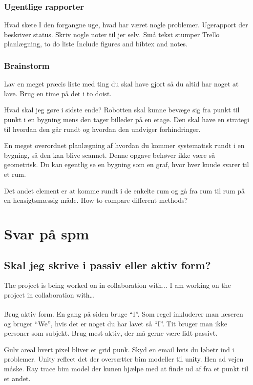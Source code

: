 \subsubsection{Ugentlige rapporter}
Hvad skete I den forgangne uge, hvad har været nogle problemer.
Ugerapport der beskriver status.
Skriv nogle noter til jer selv.
Små tekst stumper
Trello planlægning, to do liste
Include figures and bibtex and notes.


\subsubsection{Brainstorm}
Lav en meget præcis liste med ting du skal have gjort så du altid har noget at lave.
Brug en time på det i to doist.

Hvad skal jeg gøre i sidste ende?
Robotten skal kunne bevæge sig fra punkt til punkt i en bygning mens den tager billeder på en etage. Den skal have en strategi til hvordan den går rundt og hvordan den undviger forhindringer.

En meget overordnet planlægning af hvordan du kommer systematisk rundt i en bygning, så den kan blive scannet.
Denne opgave behøver ikke være så geometrisk. Du kan egentlig se en bygning som en graf, hvor hver knude svarer til et rum.

Det andet element er at komme rundt i de enkelte rum og gå fra rum til rum på en hensigtsmæssig måde.
How to compare different methods?

\section{Svar på spm}
\subsection{Skal jeg skrive i passiv eller aktiv form?}
The project is being worked on in collaboration with...
I am working on the project in collaboration with…
\\\\
Brug aktiv form. En gang på siden bruge “I”.
Som regel inkluderer man læseren og bruger “We”, hvis det er noget du har lavet så “I”.
Tit bruger man ikke personer som subjekt.
Brug mest aktiv, der må gerne være lidt passivt.


Gulv areal hvert pixel bliver et grid punk. Skyd en email hvis du løbetr ind i problemer.
Unity reflect det der oversætter bim modeller til unity. Hen ad vejen måske.
Ray trace bim model der kunen hjælpe med at finde ud af fra et punkt til et andet.



